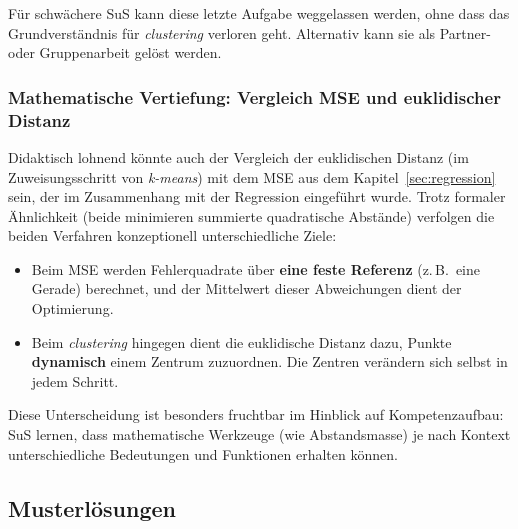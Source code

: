 Für schwächere SuS kann diese letzte Aufgabe weggelassen werden, ohne dass das Grundverständnis für \textit{clustering} verloren geht. Alternativ kann sie als Partner- oder Gruppenarbeit gelöst werden.

\subsubsection*{Mathematische Vertiefung: Vergleich MSE und euklidischer Distanz}

Didaktisch lohnend könnte auch der Vergleich der euklidischen Distanz (im Zuweisungsschritt von \textit{k-means}) mit dem MSE aus dem Kapitel~\ref{sec:regression} sein, der im Zusammenhang  mit der Regression eingeführt wurde. Trotz formaler Ähnlichkeit (beide minimieren summierte quadratische Abstände) verfolgen die beiden Verfahren konzeptionell unterschiedliche Ziele:

\begin{itemize}
  \item Beim MSE werden Fehlerquadrate über \textbf{eine feste Referenz} (z.\,B.\ eine Gerade) berechnet, und der Mittelwert dieser Abweichungen dient der Optimierung.
  \item Beim \textit{clustering} hingegen dient die euklidische Distanz dazu, Punkte \textbf{dynamisch} einem Zentrum zuzuordnen. Die Zentren verändern sich selbst in jedem Schritt.
\end{itemize}

Diese Unterscheidung ist besonders fruchtbar im Hinblick auf Kompetenzaufbau: SuS lernen, dass mathematische Werkzeuge (wie Abstandsmasse) je nach Kontext unterschiedliche Bedeutungen und Funktionen erhalten können.


\subsection*{Musterlösungen}

